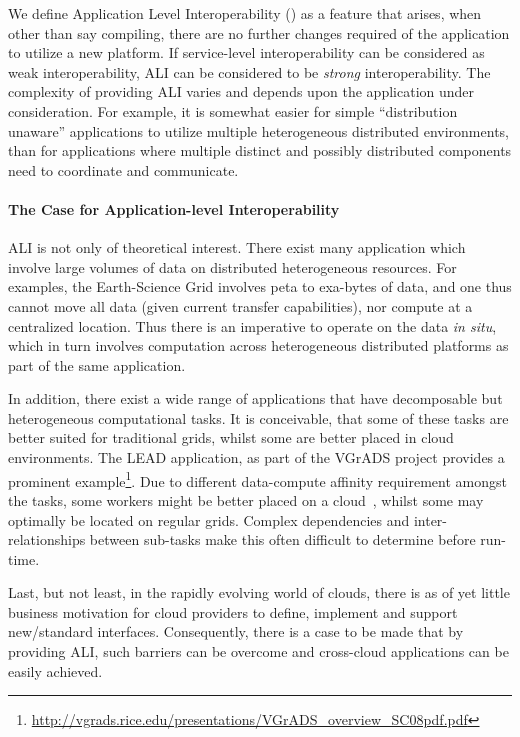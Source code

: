 \documentclass[graybox]{svmult}
\begin{document}
We define Application Level Interoperability () as a feature
that arises, when other than say compiling, there
are no further changes required of the application to utilize a new
platform.  If service-level interoperability can be considered as weak
interoperability, ALI can be considered to be {\it strong}
interoperability.  
The complexity of providing ALI varies and depends upon the
application under consideration.  For example, it is somewhat easier
for simple ``distribution unaware'' applications to utilize multiple
heterogeneous distributed environments, than for applications where
multiple distinct and possibly distributed components need to
coordinate and communicate.  


\paragraph{The Case for Application-level Interoperability}

ALI is not only of theoretical interest. There exist many application
which involve large volumes of data on distributed heterogeneous
resources. For examples, the Earth-Science Grid involves peta to
exa-bytes of data, and one thus cannot move all data (given
current transfer capabilities), nor compute at a centralized location.
Thus there is an imperative to operate on the data {\it in situ},
which in turn involves computation across heterogeneous distributed
platforms as part of the same application.
 
In addition, there exist a wide range of applications that have
decomposable but heterogeneous computational tasks. It is conceivable,
that some of these tasks are better suited for traditional grids,
whilst some are better placed in cloud environments.  The LEAD
application, as part of the VGrADS project provides a prominent
example\footnote{\url{http://vgrads.rice.edu/presentations/VGrADS_overview_SC08pdf.pdf}}.
Due to different data-compute affinity requirement amongst the tasks,
some workers might be better placed on a cloud~\cite{jha_ccpe09},
whilst some may optimally be located on regular grids. Complex
dependencies and inter-relationships between sub-tasks make this often
difficult to determine before run-time. 

Last, but not least, in the rapidly evolving world of clouds, there is
as of yet little business motivation for cloud providers to define,
implement and support new/standard interfaces. Consequently, there is
a case to be made that by providing ALI, such barriers can be overcome
and cross-cloud applications can be easily achieved.
 
\end{document}
